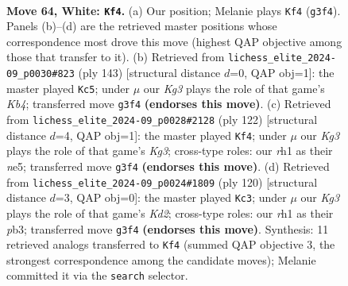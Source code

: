 \documentclass[11pt]{article}
\begin{document}
\clearpage

\begin{figure}[p]\centering
\begin{subfigure}{0.46\textwidth}\centering
\resizebox{\linewidth}{!}{%
\newchessgame
\chessboard[
  setfen={8/6k1/2pp4/p7/8/6K1/8/7r w - - 6 64},
  showmover=false,
  pgfstyle=straightmove, color=movearrow, markmove={g3-f4}
]}
\caption{}
\end{subfigure}\hfill
\begin{subfigure}{0.46\textwidth}\centering
\resizebox{\linewidth}{!}{%
\newchessgame
\chessboard[
  setfen={8/5P2/8/1k1P2P1/7R/3K4/8/8 b - - 0 72},
  showmover=false,
  pgfstyle=straightmove, color=movearrow, markmove={b5-c5}
]}
\caption{}
\end{subfigure}
\\[4pt]
\begin{subfigure}{0.46\textwidth}\centering
\resizebox{\linewidth}{!}{%
\newchessgame
\chessboard[
  setfen={8/8/7k/4n3/p2p4/6K1/8/8 w - - 0 62},
  showmover=false,
  pgfstyle=straightmove, color=movearrow, markmove={g3-f4}
]}
\caption{}
\end{subfigure}\hfill
\begin{subfigure}{0.46\textwidth}\centering
\resizebox{\linewidth}{!}{%
\newchessgame
\chessboard[
  setfen={8/5pp1/8/8/8/1p4k1/1P1K4/8 w - - 0 61},
  showmover=false,
  pgfstyle=straightmove, color=movearrow, markmove={d2-c3}
]}
\caption{}
\end{subfigure}
\caption{\textbf{Move 64, White: \texttt{Kf4}.} (a) Our position; Melanie plays \texttt{Kf4} (\texttt{g3f4}). Panels (b)--(d) are the retrieved master positions whose correspondence most drove this move (highest QAP objective among those that transfer to it). (b) Retrieved from \texttt{lichess\_elite\_2024-09\_p0030\#823} (ply 143) [structural distance $d$=0, QAP obj=1]: the master played \texttt{Kc5}; under $\mu$ our \emph{Kg3} plays the role of that game's \emph{Kb4}; transferred move \texttt{g3f4} \textbf{(endorses this move)}. (c) Retrieved from \texttt{lichess\_elite\_2024-09\_p0028\#2128} (ply 122) [structural distance $d$=4, QAP obj=1]: the master played \texttt{Kf4}; under $\mu$ our \emph{Kg3} plays the role of that game's \emph{Kg3}; cross-type roles: our \emph{r}h1 as their \emph{n}e5; transferred move \texttt{g3f4} \textbf{(endorses this move)}. (d) Retrieved from \texttt{lichess\_elite\_2024-09\_p0024\#1809} (ply 120) [structural distance $d$=3, QAP obj=0]: the master played \texttt{Kc3}; under $\mu$ our \emph{Kg3} plays the role of that game's \emph{Kd2}; cross-type roles: our \emph{r}h1 as their \emph{p}b3; transferred move \texttt{g3f4} \textbf{(endorses this move)}. Synthesis: 11 retrieved analogs transferred to \texttt{Kf4} (summed QAP objective 3, the strongest correspondence among the candidate moves); Melanie committed it via the \texttt{search} selector.}
\label{fig:thought-m126}
\end{figure}
\end{document}
